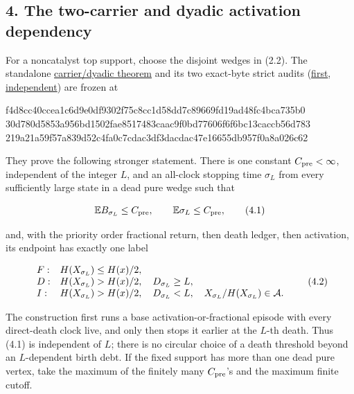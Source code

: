 \subsection{4. The two-carrier and dyadic activation
dependency}

For a noncatalyst top support, choose the disjoint wedges in (2.2). The
standalone
\href{proof_first_h111_two_carrier_dyadic_all_lower_supports_theorem.md}{carrier/dyadic
theorem} and its two exact-byte strict audits
(\href{proof_first_h111_two_carrier_dyadic_all_lower_supports_exact_byte_audit.md}{first},
\href{proof_first_h111_two_carrier_dyadic_all_lower_supports_independent_exact_byte_audit.md}{independent})
are frozen at

\begin{CodeBlock}
f4d8cc40ccea1c6d9e0df9302f75c8cc1d58dd7c89669fd19ad48fc4bca735b0
30d780d5853a956bd1502fae8517483caac9f0bd77606f6f6bc13caccb56d783
219a21a59f57a839d52c4fa0c7cdac3df3dacdac47e16655db957f0a8a026c62
\end{CodeBlock}

They prove the following stronger statement. There is one constant
\(C_{\rm pre}<\infty\), independent of the integer \(L\), and an
all-clock stopping time \(\sigma_L\) from every sufficiently large state
in a dead pure wedge such that

\[
        \mathbb E B_{\sigma_L}\le C_{\rm pre},\qquad
        \mathbb E\sigma_L\le C_{\rm pre},             \tag{4.1}
\]

and, with the priority order fractional return, then death ledger, then
activation, its endpoint has exactly one label

\[
\begin{array}{ll}
 F:&H(X_{\sigma_L})\le H(x)/2,\\
 D:&H(X_{\sigma_L})>H(x)/2,\quad D_{\sigma_L}\ge L,\\
 I:&H(X_{\sigma_L})>H(x)/2,\quad D_{\sigma_L}<L,\quad
       X_{\sigma_L}/H(X_{\sigma_L})\in{\cal A}.
\end{array}                                           \tag{4.2}
\]

The construction first runs a base activation-or-fractional episode with
every direct-death clock live, and only then stops it earlier at the
\(L\)-th death. Thus (4.1) is independent of \(L\); there is no circular
choice of a death threshold beyond an \(L\)-dependent birth debt. If the
fixed support has more than one dead pure vertex, take the maximum of
the finitely many \(C_{\rm pre}\)'s and the maximum finite cutoff.

